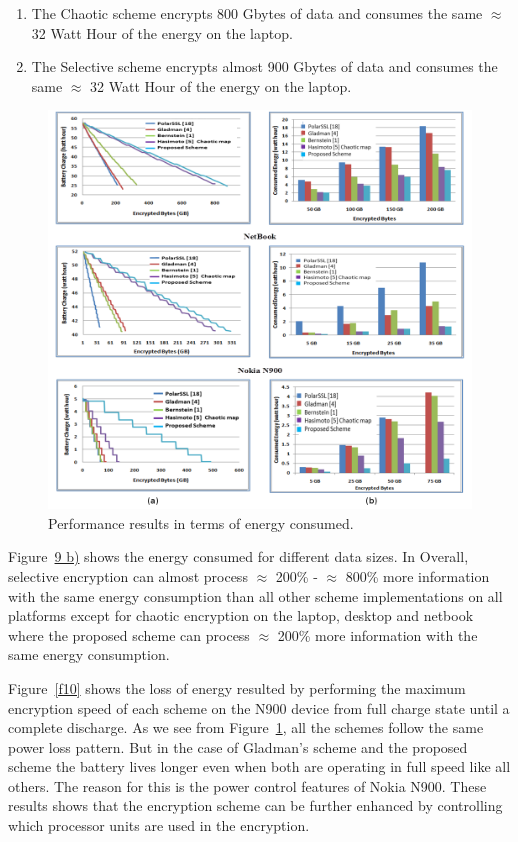 \documentclass[preprint]{elsarticle}
\begin{document}
\begin{enumerate}
\item The Chaotic scheme encrypts 800 Gbytes of data and consumes the same $\approx$ 32 Watt Hour of the energy on the laptop.
\item The Selective scheme encrypts almost 900 Gbytes of data and consumes the same $\approx$ 32 Watt Hour of the energy on the laptop.
\end{enumerate}

\begin{figure}[!ht]
\centering
\includegraphics[width=\textwidth]{figure9.png}
\caption{Performance results in terms of energy consumed.}
\label{f9}
\end{figure} 
 
Figure~\hyperref[f9]{9 b)} shows the energy consumed for different data sizes. In Overall, selective encryption can almost process $\approx$ 200\% - $\approx$ 800\% more information with the same energy consumption than all other scheme implementations on all platforms except for chaotic encryption on the laptop, desktop and netbook where the proposed scheme can process $\approx$ 200\% more information with the same energy consumption. 

Figure~\ref{f10} shows the loss of energy resulted by performing the maximum encryption speed of each scheme on the N900 device from full charge state until a complete discharge. As we see from Figure~\ref{f9}, all the schemes follow the same power loss pattern. But in the case of Gladman's scheme and the proposed scheme the battery lives longer even when both are operating in full speed like all others. The reason for this is the power control features of Nokia N900. These results shows that the encryption scheme can be further enhanced by controlling which processor units are used in the encryption.
\end{document}
